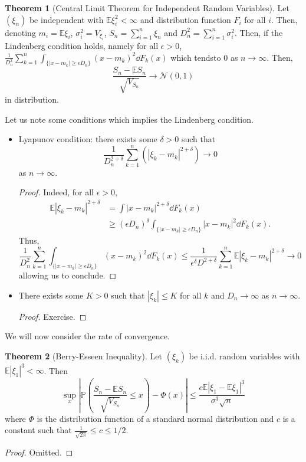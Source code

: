 \documentclass[]{article}
\theoremstyle{definition}
\newtheorem{theorem}{Theorem}
\theoremstyle{definition}
\begin{document}
\begin{theorem}[Central Limit Theorem for Independent Random Variables]
  Let \((\xi_n)\) be independent with \(\mathbb{E}\xi_i^2 < \infty\) and 
  distribution function \(F_i\) for all \(i\). Then, denoting 
  \(m_i = \mathbb{E}\xi_i\), \(\sigma_i^2 = V_{\xi_i}\), 
  \(S_n = \sum_{i = 1}^n \xi_n\) and \(D_n^2 = \sum_{i = 1}^n \sigma_i^2\). 
  Then, if the Lindenberg condition holds, namely for all \(\epsilon > 0\), 
  \(\frac{1}{D_n^2} \sum_{k = 1}^n \int_{\{|x - m_k| \ge \epsilon D_n\}}
  (x - m_k)^2 \dd F_k(x)\) which tendsto 0 as 
  \(n \to \infty\). Then, 
  \[\frac{S_n - \mathbb{E}S_n}{\sqrt{V_{S_n}}} \to \mathcal{N}(0, 1)\]
  in distribution.
\end{theorem}

Let us note some conditions which implies the Lindenberg condition.
\begin{itemize}
  \item Lyapunov condition: there exists some \(\delta > 0\) such that 
  \[\frac{1}{D_n^{2 + \delta}} \sum_{k = 1}^n(|\xi_k - m_k|^{2 + \delta})
    \to 0\]
  as \(n \to \infty\).
  \begin{proof}
    Indeed, for all \(\epsilon > 0\), 
    \[\begin{split}
      \mathbb{E}|\xi_k - m_k|^{2 + \delta} & = \int |x - m_k|^{2 + \delta} \dd F_k(x) \\
      & \ge (\epsilon D_n)^\delta \int_{\{|x - m_k| \ge \epsilon D_n\}}
        |x - m_k|^2 \dd F_k(x).
    \end{split}\]
    Thus, 
    \[\frac{1}{D_n^2}\sum_{k = 1}^n \int_{\{|x - m_k| \ge \epsilon D_n\}}
    (x - m_k)^2 \dd F_k(x) \le \frac{1}{\epsilon^\delta D^{2 + \delta}} 
    \sum_{k = 1}^n \mathbb{E}|\xi_k - m_k|^{2 + \delta} \to 0\]
    allowing us to conclude.
  \end{proof}
  \item There exists some \(K > 0\) such that \(|\xi_k| \le K\) for all \(k\) 
    and \(D_n \to \infty\) as \(n \to \infty\).
  \begin{proof}
    Exercise.
  \end{proof}
\end{itemize}

We will now consider the rate of convergence. 

\begin{theorem}[Berry-Esseen Inequality]
  Let \((\xi_k)\) be i.i.d. random variables with \(\mathbb{E}|\xi_1|^3 < \infty\). 
  Then
  \[\sup_{x} \left|\mathbb{P}\left(\frac{S_n - \mathbb{E}S_n}{\sqrt{V_{S_n}}} \le x\right) - \Phi(x)\right|
  \le \frac{c \mathbb{E}|\xi_1 - \mathbb{E}\xi_1|^3}{\sigma^3 \sqrt{n}}\]
  where \(\Phi\) is the distribution function of a standard normal distribution 
  and \(c\) is a constant such that \(\frac{1}{\sqrt{2\pi}} \le c \le 1 / 2\).
\end{theorem}
\begin{proof}
  Omitted.
\end{proof}
\end{document}
